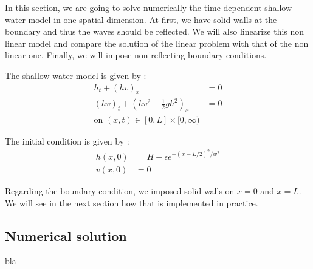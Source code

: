 In this section, we are going to solve numerically the time-dependent shallow water model in one spatial dimension. At first, we have solid walls at the boundary and thus the waves should be reflected. We will also linearize this non linear model and compare the solution of the linear problem with that of the non linear one. Finally, we will impose non-reflecting boundary conditions.

The shallow water model is given by :
\begin{align*}
h_t+(hv)_x &= 0\\
(hv)_t + (hv^2+\frac{1}{2}gh^2)_x &= 0\\
\text{on }(x,t)\in [0,L]\times [0,\infty)
\end{align*}

The initial condition is given by :
\begin{align*}
h(x,0) &= H+\epsilon e^{-(x-L/2)^2/w^2}\\
v(x,0) &= 0
\end{align*}

Regarding the boundary condition, we imposed solid walls on $x=0$ and $x=L$. We will see in the next section how that is implemented in practice.

\subsection{Numerical solution}
bla